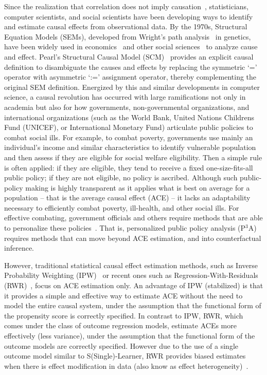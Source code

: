 \documentclass[letterpaper]{article} %
\begin{document}
Since the realization that correlation does not imply causation~\cite{wright1921correlationcausation, fisher1936designofexperiments}, statisticians, computer scientists, and social scientists have been developing ways to identify and estimate causal effects from observational data.
By the 1970s, Structural Equation Models (SEMs), developed from Wright's path analysis~\cite{wright1921correlationcausation} in genetics, have been widely used in economics~\cite{Haavelmo1943SEM, Goldberger1972SEMecon} and other social sciences~\cite{Duncan1974SEMsocio, Ploch1975SEM, Fienberg1975Introduction2SEM} to analyze cause and effect.
Pearl's Structural Causal Model (SCM)~\cite{pearl2009causality} provides an explicit causal definition to disambiguate the causes and effects by replacing the symmetric `=' operator with asymmetric `:=' assignment operator, thereby complementing the original SEM definition.
Energized by this and similar developments in computer science, a causal revolution has occurred with large ramifications not only in academia but also for how governments, non-governmental organizations, and international organizations (such as the World Bank, United Nations Childrens Fund (UNICEF), or International Monetary Fund) articulate public policies to combat social ills. For example, to combat poverty, governments use mainly an individual's income and similar characteristics to identify vulnerable population and then assess if they are eligible for social welfare eligibility. Then a simple rule is often applied: if they are eligible, they tend to receive a fixed one-size-fits-all public policy; if they are not eligible, no policy is ascribed. Although such public-policy making is highly transparent as it applies what is best on average for a population -- that is the average causal effect (ACE) -- it lacks an adaptability necessary to efficiently combat poverty, ill-health, and other social ills. For effective combating, government officials and others require methods that are able to personalize these policies~\cite{kino2021adelmlreview}. That is, personalized public policy analysis (P$^3$A) requires methods that can move beyond ACE estimation, and into counterfactual inference.

However, traditional statistical causal effect estimation methods, such as Inverse Probability Weighting (IPW)~\cite{Rosenbaum1983propensityscoreipw, hernan2009ipw} or recent ones such as Regression-With-Residuals (RWR)~\cite{wodtke2020rwr}, focus on ACE estimation only. An advantage of IPW (stabilized) is that it provides a simple and effective way to estimate ACE without the need to model the entire causal system, under the assumption that the functional form of the propensity score is correctly specified. In contrast to IPW, RWR, which comes under the class of outcome regression models, estimate ACEs more effectively (less variance), under the assumption that the functional form of the outcome models are correctly specified.
However due to the use of a single outcome model similar to S(Single)-Learner, RWR provides biased estimates when there is effect modification in data (also know as effect heterogeneity)~\cite{vanderweele2009distinctionheterogeneity}.
\end{document}
